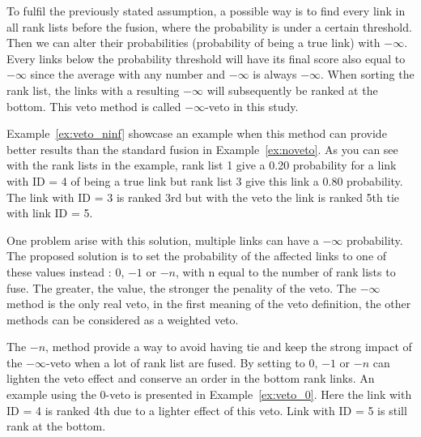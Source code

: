 To fulfil the previously stated assumption, a possible way is to find every link in all rank lists before the fusion, where the probability is under a certain threshold.
Then we can alter their probabilities (probability of being a true link) with $-\infty$.
Every links below the probability threshold will have its final score also equal to $-\infty$ since the average with any number and $-\infty$ is always $-\infty$.
When sorting the rank list, the links with a resulting $-\infty$ will subsequently be ranked at the bottom.
This veto method is called $-\infty$-veto in this study.

Example~\ref{ex:veto_ninf} showcase an example when this method can provide better results than the standard fusion in Example~\ref{ex:noveto}.
As you can see with the rank lists in the example, rank list 1 give a 0.20 probability for a link with ID = 4 of being a true link but rank list 3 give this link a 0.80 probability.
The link with ID = 3 is ranked 3rd but with the veto the link is ranked 5th tie with link ID = 5.

One problem arise with this solution, multiple links can have a $-\infty$ probability.
The proposed solution is to set the probability of the affected links to one of these values instead : $0$, $-1$ or $-n$, with n equal to the number of rank lists to fuse.
The greater, the value, the stronger the penality of the veto.
The $-\infty$ method is the only real veto, in the first meaning of the veto definition, the other methods can be considered as a weighted veto.

The $-n$, method provide a way to avoid having tie and keep the strong impact of the $-\infty$-veto when a lot of rank list are fused.
By setting to $0$, $-1$ or $-n$ can lighten the veto effect and conserve an order in the bottom rank links.
An example using the $0$-veto is presented in Example~\ref{ex:veto_0}.
Here the link with ID = 4 is ranked 4th due to a lighter effect of this veto.
Link with ID = 5 is still rank at the bottom.

